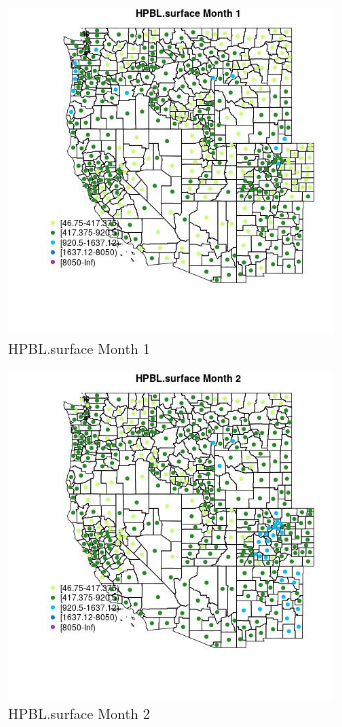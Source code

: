\begin{figure} 
\centering  
\includegraphics[width=0.77\textwidth]{Code_Outputs/df_report_ML_predictors_CountyCentroid_Locations_Dates_2008-01-01to2018-12-31_MapObsMo1HPBLsurface.jpg} 
\caption{\label{fig:df_report_ML_predictors_CountyCentroid_Locations_Dates_2008-01-01to2018-12-31MapObsMo1HPBLsurface}HPBL.surface Month 1} 
\end{figure} 
 

\begin{figure} 
\centering  
\includegraphics[width=0.77\textwidth]{Code_Outputs/df_report_ML_predictors_CountyCentroid_Locations_Dates_2008-01-01to2018-12-31_MapObsMo2HPBLsurface.jpg} 
\caption{\label{fig:df_report_ML_predictors_CountyCentroid_Locations_Dates_2008-01-01to2018-12-31MapObsMo2HPBLsurface}HPBL.surface Month 2} 
\end{figure} 
 

